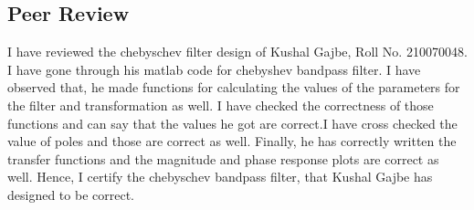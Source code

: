 \documentclass{article}
\begin{document}
\newpage
\subsection{Peer Review}
I have reviewed the chebyschev filter design of Kushal Gajbe, Roll No. 210070048. I have gone through his matlab code for chebyshev bandpass filter. I have observed that, he made functions for calculating the values of the parameters for the filter and transformation as well. I have checked the correctness of those functions and can say that the values he got are correct.I have cross checked the value of poles and those are correct as well. Finally, he has correctly written the transfer functions and the magnitude and phase response plots are correct as well. Hence, I certify the chebyschev bandpass filter, that Kushal Gajbe has designed to be correct.
\end{document}
